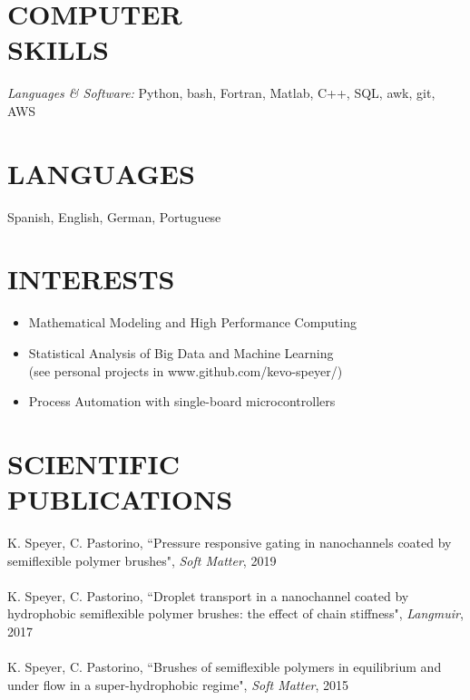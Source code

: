 \documentclass[margin]{res}
\begin{document}
\begin{resume}
 
\section{COMPUTER \\ SKILLS} {\sl Languages \& Software:} Python, bash, 
		Fortran, Matlab, C++, SQL, awk, git, AWS 
               
 
\section{LANGUAGES}  Spanish, English, German, Portuguese 

\section{INTERESTS}        
       \begin{itemize}  \itemsep -2pt %
        \item	Mathematical Modeling and High Performance Computing 
	\item   Statistical Analysis of Big Data and Machine Learning \\ 
	    	(see personal projects in www.github.com/kevo-speyer/) 
    	\item	Process Automation with single-board microcontrollers 
       \end{itemize}
 
\section{SCIENTIFIC \\ PUBLICATIONS}            
		       K. Speyer, C. Pastorino, ``Pressure responsive gating in 
		nanochannels coated by semiflexible polymer brushes", 
		       {\sl Soft Matter}, 2019 \\ \\ 
		       K. Speyer, C. Pastorino, ``Droplet transport in a 
		nanochannel coated by hydrophobic semiflexible polymer 
		       brushes: the effect of chain stiffness", {\sl Langmuir},
		       2017 \\ \\
		K. Speyer, C. Pastorino, ``Brushes of semiflexible polymers in 
		equilibrium and under flow in a super-hydrophobic regime", 
		       {\sl Soft Matter}, 2015 


\end{resume}
\end{document}
